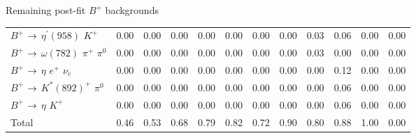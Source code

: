 \documentclass[xcolor=dvipsnames]{beamer}
\begin{document}
\begin{frame}{Remaining post-fit $B^+$ backgrounds}
{\begin{tabular}{lrrrrrrrrrrr}
      $B^{+}$ $\rightarrow$ $\eta^{\prime}(958)$ $K^{+}$                           &         0.00 &         0.00 &         0.00 &         0.00 &         0.00 &         0.00 &         0.00 &         0.03 &         0.06 &         0.00 &         0.00 \\
      $B^{+}$ $\rightarrow$ $\omega(782)$ $\pi^{+}$ $\pi^{0}$                      &         0.00 &         0.00 &         0.00 &         0.00 &         0.00 &         0.00 &         0.00 &         0.03 &         0.00 &         0.00 &         0.00 \\
      $B^{+}$ $\rightarrow$ $\eta$ $e^{+}$ $\nu_{e}$                               &         0.00 &         0.00 &         0.00 &         0.00 &         0.00 &         0.00 &         0.00 &         0.00 &         0.12 &         0.00 &         0.00 \\
      $B^{+}$ $\rightarrow$ $K^{*}(892)^{+}$ $\pi^{0}$                             &         0.00 &         0.00 &         0.00 &         0.00 &         0.00 &         0.00 &         0.00 &         0.00 &         0.06 &         0.00 &         0.00 \\
      $B^{+}$ $\rightarrow$ $\eta$ $K^{+}$                                         &         0.00 &         0.00 &         0.00 &         0.00 &         0.00 &         0.00 &         0.00 &         0.00 &         0.06 &         0.00 &         0.00 \\
      \hline
      Total                                                                &         0.46 &         0.53 &         0.68 &         0.79 &         0.82 &         0.72 &         0.90 &         0.80 &         0.88 &         1.00 &         0.00 \\
      \hline
      \end{tabular}
      }
   
\end{frame}
\end{document}
